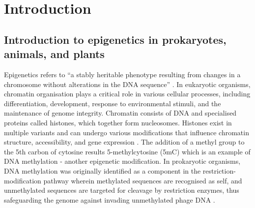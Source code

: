 
\chapter{Introduction}  %

\ifpdf
    \graphicspath{{Chapter1/Figs/Raster/}{Chapter1/Figs/PDF/}{Chapter1/Figs/}}
\else
    \graphicspath{{Chapter1/Figs/Vector/}{Chapter1/Figs/}}
\fi


\section{Introduction to epigenetics in prokaryotes, animals, and plants } %

Epigenetics refers to “a stably heritable phenotype resulting from changes in a chromosome without alterations in the DNA sequence” \cite{RN135}. In eukaryotic organisms, chromatin organisation plays a critical role in various cellular processes, including differentiation, development, response to environmental stimuli, and the maintenance of genome integrity. Chromatin consists of DNA and specialised proteins called histones, which together form nucleosomes. Histones exist in multiple variants and can undergo various modifications that influence chromatin structure, accessibility, and gene expression \cite{RN289,RN284}. The addition of a methyl group to the 5th carbon of cytosine results 5-methylcytosine (5mC) which is an example of DNA methylation - another epigenetic modification. In prokaryotic organisms, DNA methylation was originally identified as a component in the restriction-modification pathway wherein methylated sequences are recognised as self, and unmethylated sequences are targeted for cleavage by restriction enzymes, thus safeguarding the genome against invading unmethylated phage DNA \cite{RN96,RN95}.

